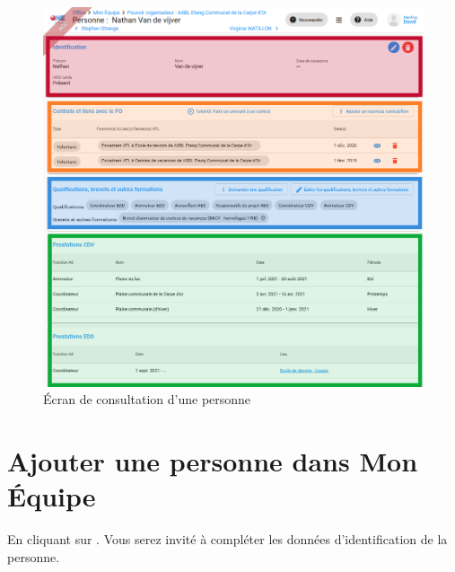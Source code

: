 \begin{figure}[H]
    \centering
    \includegraphics[width=14cm]{Images/team/personne.png}
    \caption{Écran de consultation d'une personne}
    \label{fig:personne}
\end{figure}



\section{Ajouter une personne dans Mon Équipe}\label{team_add_person}
En cliquant sur . Vous serez invité à compléter les données d'identification de la personne. 


